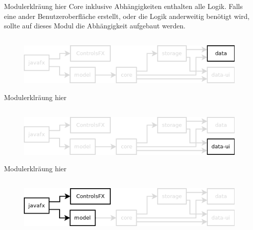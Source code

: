Modulerklräung hier
Core inklusive Abhängigkeiten enthalten alle Logik. Falls eine ander Benutzeroberfläche erstellt,
oder die Logik anderweitig benötigt wird, sollte auf dieses Modul die Abhängigkeit aufgebaut werden.




\subsection{\textModData}
\label{\textModData}
\begin{figure}[h!]
	\centering
	\includegraphics[width=.8\textwidth]{module_dependencies_data.png}
\end{figure}

Modulerklräung hier




\subsection{\textModDataUI}
\label{\textModDataUI}
\begin{figure}[h!]
	\centering
	\includegraphics[width=.8\textwidth]{module_dependencies_data-ui.png}
\end{figure}

Modulerklräung hier




\subsection{\textModJavaFX}
\label{\textModJavaFX}
\begin{figure}[h!]
	\centering
	\includegraphics[width=.8\textwidth]{module_dependencies_javafx.png}
\end{figure}

